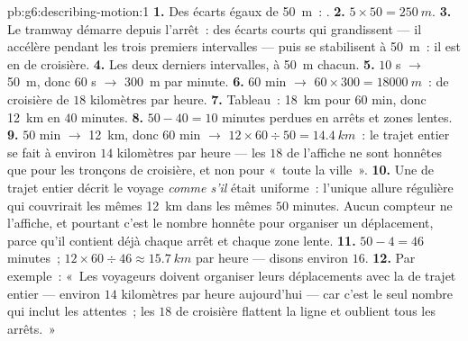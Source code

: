 \begin{solution}{pb:g6:describing-motion:1}
\textbf{1.} Des écarts égaux de \qty{50}{m}~: .
\textbf{2.} $5 \times 50 = \qty{250}{m}$.
\textbf{3.} Le tramway démarre depuis l'arrêt~: des écarts courts qui
grandissent --- il accélère pendant les trois premiers
intervalles --- puis se stabilisent à \qty{50}{m}~: il est en
 de croisière.
\textbf{4.} Les deux derniers intervalles, à \qty{50}{m} chacun.
\textbf{5.} $10$ s $\to$ \qty{50}{m}, donc $60$ s $\to$
\qty{300}{m} par minute.
\textbf{6.} $60$ min $\to$ $60 \times 300 = \qty{18000}{m}$~:
 de croisière de $18$ kilomètres par heure.
\textbf{7.} Tableau~: \qty{18}{km} pour $60$ min, donc \qty{12}{km}
en $40$ minutes.
\textbf{8.} $50 - 40 = 10$ minutes perdues en arrêts et zones
lentes.
\textbf{9.} $50$ min $\to$ \qty{12}{km}, donc $60$ min $\to$
$12 \times 60 \div 50 = \qty{14.4}{km}$~: le trajet entier se fait à
environ $14$ kilomètres par heure --- les $18$ de l'affiche ne sont
honnêtes que pour les tronçons de croisière, et non pour «~toute la
ville~».
\textbf{10.} Une  de trajet entier décrit le voyage
\emph{comme s'il} était uniforme~: l'unique allure régulière qui
couvrirait les mêmes \qty{12}{km} dans les mêmes $50$ minutes. Aucun
compteur ne l'affiche, et pourtant c'est le nombre honnête pour
organiser un déplacement, parce qu'il contient déjà chaque arrêt et
chaque zone lente.
\textbf{11.} $50 - 4 = 46$ minutes~; $12 \times 60 \div 46 \approx
\qty{15.7}{km}$ par heure --- disons environ $16$.
\textbf{12.} Par exemple~: «~Les voyageurs doivent organiser leurs
déplacements avec la  de trajet entier --- environ $14$
kilomètres par heure aujourd'hui --- car c'est le seul nombre qui
inclut les attentes~; les $18$ de croisière flattent la ligne et
oublient tous les arrêts.~»
\end{solution}
